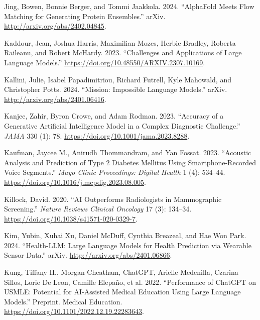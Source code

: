 \documentclass[
  Letterpaper,
]{scrbook}
\newlength{\cslhangindent}
\newenvironment{CSLReferences}[2] %
 {\begin{list}{}{%
  \setlength{\itemindent}{0pt}
  \setlength{\leftmargin}{0pt}
  \setlength{\parsep}{0pt}
  \ifodd #1
   \setlength{\leftmargin}{\cslhangindent}
   \setlength{\itemindent}{-1\cslhangindent}
  \fi
  \setlength{\itemsep}{#2\baselineskip}}}
 {\end{list}}
\begin{document}
\begin{CSLReferences}{1}{0}
Jing, Bowen, Bonnie Berger, and Tommi Jaakkola. 2024. {``{AlphaFold}
{Meets} {Flow} {Matching} for {Generating} {Protein} {Ensembles}.''}
arXiv. \url{http://arxiv.org/abs/2402.04845}.

Kaddour, Jean, Joshua Harris, Maximilian Mozes, Herbie Bradley, Roberta
Raileanu, and Robert McHardy. 2023. {``Challenges and {Applications} of
{Large} {Language} {Models}.''}
\url{https://doi.org/10.48550/ARXIV.2307.10169}.

Kallini, Julie, Isabel Papadimitriou, Richard Futrell, Kyle Mahowald,
and Christopher Potts. 2024. {``Mission: {Impossible} {Language}
{Models}.''} arXiv. \url{http://arxiv.org/abs/2401.06416}.

Kanjee, Zahir, Byron Crowe, and Adam Rodman. 2023. {``Accuracy of a
{Generative} {Artificial} {Intelligence} {Model} in a {Complex}
{Diagnostic} {Challenge}.''} \emph{JAMA} 330 (1): 78.
\url{https://doi.org/10.1001/jama.2023.8288}.

Kaufman, Jaycee M., Anirudh Thommandram, and Yan Fossat. 2023.
{``Acoustic {Analysis} and {Prediction} of {Type} 2 {Diabetes}
{Mellitus} {Using} {Smartphone}-{Recorded} {Voice} {Segments}.''}
\emph{Mayo Clinic Proceedings: Digital Health} 1 (4): 534--44.
\url{https://doi.org/10.1016/j.mcpdig.2023.08.005}.

Killock, David. 2020. {``{AI} Outperforms Radiologists in Mammographic
Screening.''} \emph{Nature Reviews Clinical Oncology} 17 (3): 134--34.
\url{https://doi.org/10.1038/s41571-020-0329-7}.

Kim, Yubin, Xuhai Xu, Daniel McDuff, Cynthia Breazeal, and Hae Won Park.
2024. {``Health-{LLM}: {Large} {Language} {Models} for {Health}
{Prediction} via {Wearable} {Sensor} {Data}.''} arXiv.
\url{http://arxiv.org/abs/2401.06866}.

Kung, Tiffany H., Morgan Cheatham, ChatGPT, Arielle Medenilla, Czarina
Sillos, Lorie De Leon, Camille Elepaño, et al. 2022. {``Performance of
{ChatGPT} on {USMLE}: {Potential} for {AI}-{Assisted} {Medical}
{Education} {Using} {Large} {Language} {Models}.''} Preprint. Medical
Education. \url{https://doi.org/10.1101/2022.12.19.22283643}.


\end{CSLReferences}
\end{document}
